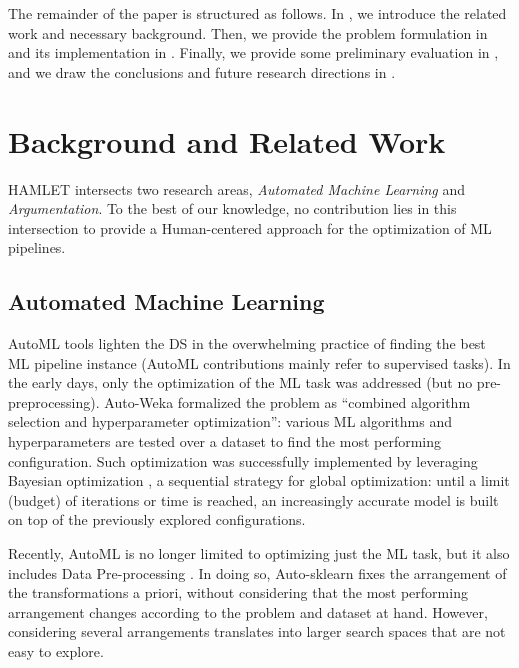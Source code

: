 \documentclass[5p,times]{elsarticle}
\begin{document}
The remainder of the paper is structured as follows. In , we introduce the related work and necessary background. Then, we provide the problem formulation in  and its implementation in .
Finally, we provide some preliminary evaluation in , and we draw the conclusions and future research directions in .

\section{Background and Related Work}\label{sec:related}
HAMLET intersects two research areas, \emph{Automated Machine Learning} and \emph{Argumentation}. 
To the best of our knowledge, no contribution lies in this intersection to provide a Human-centered approach for the optimization of ML pipelines.

\subsection{Automated Machine Learning}
AutoML tools lighten the DS in the overwhelming practice of finding the best ML pipeline instance (AutoML contributions mainly refer to supervised tasks).
In the early days, only the optimization of the ML task was addressed (but no pre-preprocessing).
Auto-Weka \cite{kotthoff2019auto} formalized the problem as ``combined algorithm selection and hyperparameter optimization'': various ML algorithms and hyperparameters are tested over a dataset to find the most performing configuration. Such optimization was successfully implemented by leveraging Bayesian optimization \cite{frazier2018tutorial}, a sequential strategy for global optimization: until a limit (budget) of iterations or time is reached, an increasingly accurate model is built on top of the previously explored configurations.

Recently, AutoML is no longer limited to optimizing just the ML task, but it also includes Data Pre-processing \cite{giovanelli2021effective, quemy2019data}.
In doing so, Auto-sklearn \cite{feurer2019auto} fixes the arrangement of the transformations a priori, without considering that the most performing arrangement changes according to the problem and dataset at hand.
However, considering several arrangements translates into larger search spaces that are not easy to explore.
\end{document}
